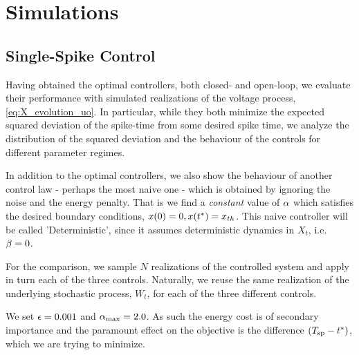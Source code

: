 \documentclass[12pt]{iopart}
\begin{document}

\section{Simulations} 
\subsection{Single-Spike Control}
\label{sec:probabilistic_numerical_test}
Having obtained the optimal controllers, both closed- and open-loop, we evaluate
their performance with simulated realizations of the voltage process,
\cref{eq:X_evolution_uo}. In particular, while they both minimize the expected
squared deviation of the spike-time from some desired spike time, we analyze
the distribution of the squared deviation and the behaviour of the
controls for different parameter regimes.

In addition to the optimal controllers, we also show the behaviour of
another control law - perhaps the most naive one - which is obtained by ignoring
the noise and the energy penalty. That is we find a {\sl constant} value of ${\alpha}$
which satisfies the desired boundary conditions, $x(0) = 0, x({ t^* }) = { x_{th} }$. This naive
controller will be called 'Deterministic', since it assumes deterministic
dynamics in $X_t$, i.e.\ ${\beta} = 0$.

For the comparison, we sample $N$ realizations of the controlled system
and apply in turn each of the three controls. Naturally, we reuse the same
realization of the underlying stochastic process, $W_t$, for each of the
three different controls.

We set ${\epsilon} = 0.001$ and ${ {\alpha}_{\textrm{max}} } = 2.0$. As such the energy cost is of secondary
importance and the paramount effect on the objective is the difference $({ T_{\textrm{sp} } } -
{ t^* })$, which we are trying to minimize.
\end{document}
